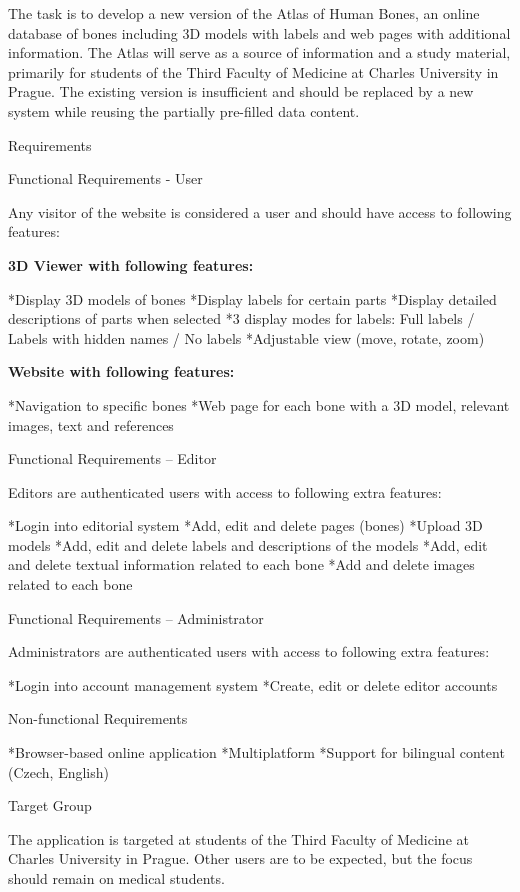 The task is to develop a new version of the Atlas of Human Bones, an online database of bones including 3D models with labels and web pages with additional information. The Atlas will serve as a source of information and a study material, primarily for students of the Third Faculty of Medicine at Charles University in Prague. The existing version is insufficient and should be replaced by a new system while reusing the partially pre-filled data content.

\sec Requirements

\secc Functional Requirements - User

Any visitor of the website is considered a user and should have access to following features:

\vskip 10pt
{\bf 3D Viewer with following features:}

\begitems
*Display 3D models of bones
*Display labels for certain parts
*Display detailed descriptions of parts when selected
*3 display modes for labels: Full labels / Labels with hidden names / No labels
*Adjustable view (move, rotate, zoom)
\enditems

\vskip 10pt
{\bf Website with following features:}

\begitems
*Navigation to specific bones
*Web page for each bone with a 3D model, relevant images, text and references
\enditems

\secc Functional Requirements – Editor

Editors are authenticated users with access to following extra features:

\begitems
*Login into editorial system
*Add, edit and delete pages (bones)
*Upload 3D models
*Add, edit and delete labels and descriptions of the models
*Add, edit and delete textual information related to each bone
*Add and delete images related to each bone
\enditems

\secc Functional Requirements – Administrator

Administrators are authenticated users with access to following extra features:

\begitems
*Login into account management system
*Create, edit or delete editor accounts
\enditems

\secc Non-functional Requirements

\begitems
*Browser-based online application
*Multiplatform
*Support for bilingual content (Czech, English)
\enditems

\sec Target Group

The application is targeted at students of the Third Faculty of Medicine at Charles University in Prague. Other users are to be expected, but the focus should remain on medical students.

